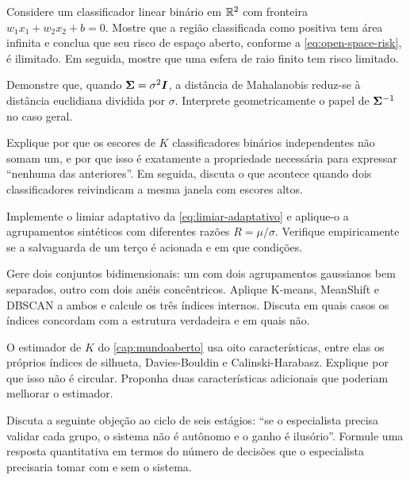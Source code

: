 \begin{exercicios}
\item Considere um classificador linear binário em $\mathbb{R}^2$ com fronteira
      $w_1 x_1 + w_2 x_2 + b = 0$. Mostre que a região classificada como positiva tem
      área infinita e conclua que seu risco de espaço aberto, conforme a
      \cref{eq:open-space-risk}, é ilimitado. Em seguida, mostre que uma esfera de raio
      finito tem risco limitado.

\item Demonstre que, quando $\bm{\Sigma} = \sigma^2\bm{I}$, a distância de Mahalanobis
      reduz-se à distância euclidiana dividida por $\sigma$. Interprete geometricamente o
      papel de $\bm{\Sigma}^{-1}$ no caso geral.

\item Explique por que os escores de $K$ classificadores binários independentes não somam
      um, e por que isso é exatamente a propriedade necessária para expressar ``nenhuma
      das anteriores''. Em seguida, discuta o que acontece quando dois classificadores
      reivindicam a mesma janela com escores altos.

\item Implemente o limiar adaptativo da \cref{eq:limiar-adaptativo} e aplique-o a
      agrupamentos sintéticos com diferentes razões $R = \mu/\sigma$. Verifique
      empiricamente se a salvaguarda de um terço é acionada e em que condições.

\item Gere dois conjuntos bidimensionais: um com dois agrupamentos gaussianos bem
      separados, outro com dois anéis concêntricos. Aplique K-means, MeanShift e DBSCAN
      a ambos e calcule os três índices internos. Discuta em quais casos os índices
      concordam com a estrutura verdadeira e em quais não.

\item O estimador de $K$ do \cref{cap:mundoaberto} usa oito características, entre elas
      os próprios índices de silhueta, Davies-Bouldin e Calinski-Harabasz. Explique por
      que isso não é circular. Proponha duas características adicionais que poderiam
      melhorar o estimador.

\item Discuta a seguinte objeção ao ciclo de seis estágios: ``se o especialista precisa
      validar cada grupo, o sistema não é autônomo e o ganho é ilusório''. Formule uma
      resposta quantitativa em termos do número de decisões que o especialista precisaria
      tomar com e sem o sistema.
\end{exercicios}


